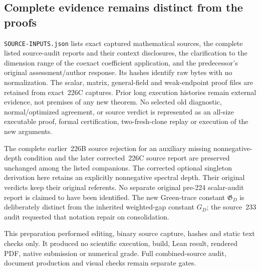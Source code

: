 \subsection*{Complete evidence remains distinct from the proofs}
\texttt{SOURCE-INPUTS.json} lists exact captured mathematical sources,
the complete listed source-audit reports and their context disclosures,
the clarification to the dimension range of the coexact coefficient
application, and the predecessor's original assessment/author response.
Its hashes identify raw bytes with no normalization. The scalar, matrix,
general-field and weak-endpoint proof files are retained from exact~226C
captures. Prior long execution histories remain external evidence, not
premises of any new theorem. No selected old diagnostic, normal/optimized
agreement, or source verdict is represented as an all-size executable proof,
formal certification, two-fresh-clone replay or execution of the new arguments.

The complete earlier~226B source rejection for an auxiliary missing
nonnegative-depth condition and the later corrected~226C source report are
preserved unchanged among the listed companions. The corrected optional
singleton derivation here retains an explicitly nonnegative spectral depth.
Their original verdicts keep their original referents. No separate original
pre-224 scalar-audit report is claimed to have been identified.
The new Green-trace constant $\mathfrak G_D$ is deliberately distinct from
the inherited weighted-gap constant $G_D$; the source~233 audit requested
that notation repair on consolidation.

This preparation performed editing, binary source capture, hashes and static
text checks only. It produced no scientific execution, build, Lean result,
rendered PDF, native submission or numerical grade. Full combined-source
audit, document production and visual checks remain separate gates.
